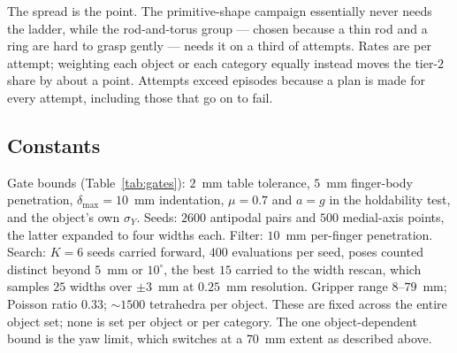 The spread is the point. The primitive-shape campaign essentially never needs the ladder, while the
rod-and-torus group --- chosen because a thin rod and a ring are hard to grasp gently --- needs it
on a third of attempts. Rates are per attempt; weighting each object or each category equally
instead moves the tier-$2$ share by about a point. Attempts exceed episodes because a plan is made
for every attempt, including those that go on to fail.

\subsection{Constants}
\label{app:synth:constants}
Gate bounds (Table~\ref{tab:gates}): $2$~mm table tolerance, $5$~mm finger-body penetration,
$\delta_{\max}=10$~mm indentation, $\mu=0.7$ and $a=g$ in the holdability test, and the object's
own $\sigma_Y$. Seeds: $2600$ antipodal pairs and $500$ medial-axis points, the latter expanded to
four widths each. Filter: $10$~mm per-finger penetration. Search: $K=6$ seeds carried forward, $400$
evaluations per seed, poses counted distinct beyond $5$~mm or $10^\circ$, the best $15$ carried to
the width rescan, which samples $25$ widths over $\pm3$~mm at $0.25$~mm resolution. Gripper range
$8$--$79$~mm; Poisson ratio $0.33$; $\sim\!1500$ tetrahedra per object. These are fixed across the
entire object set; none is set per object or per category. The one object-dependent bound is the
yaw limit, which switches at a $70$~mm extent as described above.
